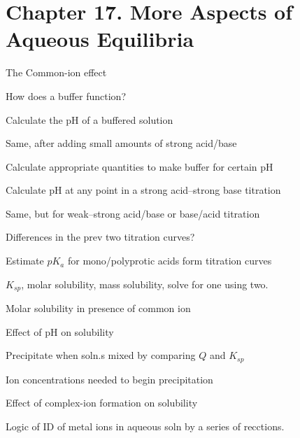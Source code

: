 \section{Chapter 17. More Aspects of Aqueous Equilibria}

\secttoc

{\footnotesize \begin{multicols}{3}\begin{compactenum}
\item The Common-ion effect
\item How does a buffer function?
\item Calculate the pH of a buffered solution
\item Same, after adding small amounts of strong acid/base
\item Calculate appropriate quantities to make buffer for certain pH
\item Calculate pH at any point in a strong acid--strong base titration
\item Same, but for weak--strong acid/base or base/acid titration
\item Differences in the prev two titration curves?
\item Estimate $pK_a$ for mono/polyprotic acids form titration curves
\item $K_{sp}$, molar solubility, mass solubility, solve for one
    using two.
\item Molar solubility in presence of common ion
\item Effect of pH on solubility
\item Precipitate when soln.s mixed by comparing $Q$ and $K_{sp}$
\item Ion concentrations needed to begin precipitation
\item Effect of complex-ion formation on solubility
\item Logic of ID of metal ions in aqueous soln by a series of recctions.
\end{compactenum}\end{multicols}}

